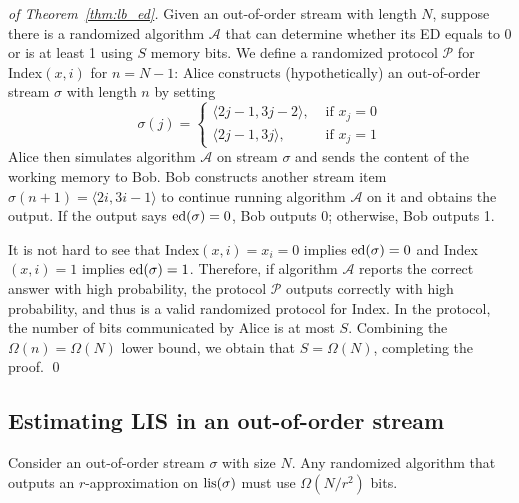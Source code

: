 \documentclass{llncs}
\newcommand{\ind}{{\sc Index}}
\newcommand{\ed}{{\rm ed}}
\newcommand{\lis}{{\rm lis}}
\begin{document}
\begin{proof}[of Theorem~\ref{thm:lb_ed}]
  Given an out-of-order stream with length $N$, suppose there is a
  randomized algorithm $\mathcal{A}$ that can determine whether its ED equals to
  0 or is at least 1 using $S$ memory bits.  We define a randomized
  protocol $\mathcal{P}$ for \ind$(x,i)$ for $n = N - 1$: Alice constructs
  (hypothetically) an out-of-order stream $\sigma$ with length $n$ by setting
  \begin{equation}
    \sigma(j) = \left\{ \begin{array}{ll}
    \langle 2j-1, 3j-2\rangle, &\textrm{ if } x_j = 0 \\
    \langle 2j-1, 3j\rangle, &\textrm{ if } x_j = 1 
  \end{array}\right.
  \label{eq:ed_map}
  \end{equation}
  Alice then simulates algorithm $\mathcal{A}$ on stream $\sigma$ and sends the
  content of the working memory to Bob.  Bob constructs another stream item
  $\sigma(n+1) = \langle 2i, 3i-1 \rangle$ to continue running algorithm
  $\mathcal{A}$ on it and obtains the output.  If the output says $\ed(\sigma) =
  0$, Bob outputs 0; otherwise, Bob outputs 1.

  It is not hard to see that \ind$(x,i) = x_i = 0$ implies $\ed(\sigma) = 0$ and
  \ind$(x,i) = 1$ implies $\ed(\sigma) = 1$.  Therefore, if algorithm
  $\mathcal{A}$ reports the correct answer with high probability, the protocol
  $\mathcal{P}$ outputs correctly with high probability, and thus is a valid
  randomized protocol for \ind.  In the protocol, the number of bits communicated by Alice is
  at most $S$.  Combining the $\Omega(n) = \Omega(N)$ lower bound, we obtain
  that $S = \Omega(N)$, completing the proof.
\hfill\qed
\end{proof}

\subsection{Estimating LIS in an out-of-order stream}

\begin{theorem}\label{thm:lb_lis}
  Consider an out-of-order stream $\sigma$ with size $N$.  Any randomized
  algorithm that outputs an $r$-approximation on $\lis(\sigma)$ must use
  $\Omega(N/r^2)$ bits.
\end{theorem}
\end{document}
